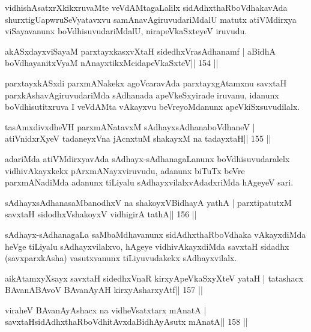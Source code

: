 \begin{artha}
vidhishAsatxrXkikxruvaMte veVdAMtagaLalilx sidAdhxthaRboVdhakavAda shurxtigU\break apwruSeVyatavxvu samAnavAgiruvudariMdalU matutx atiVMdirxya viSayavanunx boVdhisuvudariMdalU, nirapeVkaSxteyeV iruvudu.
\end{artha}

\begin{shl}
akASxdayxviSayaM parxtayxkasxvXtaH sidedhxVrasAdhanamf |
aBidhA boVdhayanitxVyaM nAnayxtikxMcidapeVkaSxteV\hfill || 154 ||
\end{shl}

\begin{artha}
parxtayxkASxdi parxmANakekx agoVcaravAda parxtayxgAtamxnu savxtaH parxkAshavAgiruvudariMda sAdhanada apeVkeSxyirade iruvanu, idanunx boVdhisutitxruva I veVdAMta vAkayxvu beVreyoMdanunx apeVkiSxsuvudilalx.
\end{artha}

\begin{shl}
tasAmxdivxdheVH parxmANatavxM sAdhayxsAdhanaboVdhaneV |
atiVnidxrXyeV tadaneyxVna jAcnxtuM shakayxM na tadayxtaH\hfill || 155 ||
\end{shl}

\begin{artha}
adariMda atiVMdirxyavAda sAdhayx-sAdhanagaLanunx boVdhisuvudaralelx vidhivAkayxkekx pArxmANayxviruvudu, adanunx biTuTx beVre parxmANadiMda adanunx tiLiyalu sAdhayxvilalxvAdadxriMda hAgeyeV sari.
\end{artha}

\begin{shl}
sAdhayxsAdhanasaMbanodhxV na shakoyxV\s BidhayA yathA |
parxtipatutxM savxtaH sidodhxV\s shakoyxV vidhigirA tathA\hfill || 156 ||
\end{shl}

\begin{artha}
sAdhayx-sAdhanagaLa saMbaMdhavanunx sidAdhxthaRboVdhaka vAkayxdiMda heVge tiLiyalu sAdhayxvilalxvo, hAgeye vidhivAkayxdiMda savxtaH sidadhx (savxparxkAsha) vasutxvanunx tiLiyuvudakekx sAdhayxvilalx.
\end{artha}


\begin{shl}
aikAtamxyXsayx savxtaH sidedhxVnaR kirxyA\s peVkaSxyXteV yataH |
tatashacx BAvanABAvoV BAvanAyAH kirxyAsharxyAtf\hfill || 157 ||
\end{shl}

\begin{shl}
viraheV BAvanAyAshacx na vidheVsatxtarx mAnatA |
savxtaHsidAdhxthaRboVdhitAvxdaBidhAyAsutx mAnatA\hfill || 158 ||
\end{shl}

